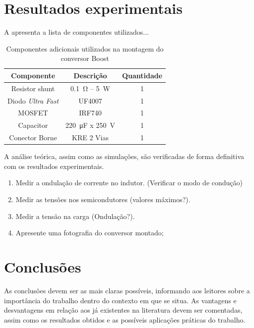 \section{Resultados experimentais}


A  apresenta a lista de componentes utilizados...

\begin{table}[!ht]
	\centering
	\caption{Componentes adicionais utilizados na montagem do conversor Boost}
	\label{tab:componentesBoost}
	\begin{tabular}{@{}ccc@{}}
		\toprule
		\textbf{Componente} & \textbf{Descrição} & \textbf{Quantidade} \\ \midrule
		Resistor shunt      & \SI{0.1}{\ohm} -- \SI{5}{\W}             & 1                   \\
		Diodo \emph{Ultra Fast}           & UF4007             & 1                   \\
					MOSFET              & IRF740             & 1                   \\
		Capacitor           & \SI{220}{\micro\farad} x \SI{250}{\V}      & 1                   \\
		Conector Borne      &  KRE 2 Vias    & 1                   \\
		\bottomrule
	\end{tabular}
\end{table}

A análise teórica, assim como as simulações, são verificadas de forma definitiva com os resultados experimentais.
\begin{enumerate}									
	\item  Medir a ondulação de corrente no indutor. (Verificar o modo de condução)
	\item  Medir as tensões nos semicondutores (valores máximos?).
	\item Medir a tensão na carga (Ondulação?).
	\item  Apresente uma fotografia do conversor montado;
\end{enumerate}

\section{Conclusões} 


As conclusões devem ser as mais claras possíveis, informando aos leitores sobre a importância do trabalho dentro do contexto em que se situa. As vantagens e desvantagens em relação aos já existentes na literatura devem ser comentadas, assim como os resultados obtidos e as possíveis aplicações práticas do trabalho.





\balance


